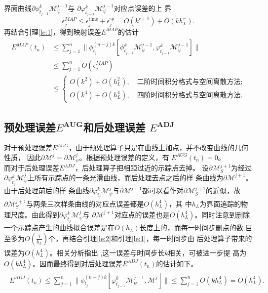 \documentclass[a4paper,twoside]{ctexart}
\begin{document}
界面曲线$\partial\phi_{t_{j-1}}^{k}\mathcal{M}_{\psi}^{j-1}$与
$\partial\varphi_{t_{j-1}}^{k}\mathcal{M}_{\psi}^{j-1}$对应点误差的上
界
\begin{equation}
  \label{eq:errbound}
  \epsilon_j^{MAP} \le \epsilon_j^{\text{time}} +
  \epsilon_j^{\text{sp}} = O(k^{r+1}) + O(kh_L^r).
\end{equation}
再结合引理\ref{le:1}，得到映射误差$E^{MAP}$的估计
\begin{eqnarray}
  \label{eq:calEMAP}
  \begin{aligned}
    E^{MAP}(t_n) &\le \sum_{j=1}^{n}\| \phi_{t_j}^{(n-j)k}[\phi_{t_{j-1}}^{k}\mathcal{M}_{\psi}^{j-1},\varphi_{t_{j-1}}^{k}\mathcal{M}_{\psi}^{j-1}]
    \|\\
    &\le \sum_{j=1}^{n}O(\epsilon_j^{MAP})\\
    &\le \begin{cases}
 O(k^2) + O(h_L^2),\quad \text{二阶时间积分格式与空间离散方法;}\\
 O(k^4) + O(h_L^4),\quad \text{四阶时间积分格式与空间离散方法.}
\end{cases}
  \end{aligned}
\end{eqnarray}
\subsection{预处理误差$E^{\textbf{AUG}}$和后处理误差
  $E^{\textbf{ADJ}}$}
\label{sec:AUGandADJ}
对于预处理误差$E^{AUG}$，由于预处理算子只是在曲线上加点，并不改变曲线的几何性质，
因此$\partial \mathcal{M}^j = \partial \mathcal{M}_{\psi}^j$。根据预处理误差的定义，有
$E^{AUG}(t_n) = 0$。\\
\indent 而对于后处理误差$E^{ADJ}$，后处理算子把相距过近的示踪点去掉。
设$\partial \mathcal{M}_S^{j+1}$为经过$\partial \varphi_{t_j}^k
\mathcal{M}_{\psi}^j$上所有示踪点的一条光滑曲线，而后处理去点之后的样
条曲线为$\partial \mathcal{M}^{j+1}$。由于后处理前后的样
条曲线$\partial \varphi_{t_j}^k
\mathcal{M}_{\psi}^j$与$\partial \mathcal{M}^{j+1}$都可以看作对$\partial \mathcal{M}_S^{j+1} $的近似，故$\partial
\mathcal{M}_S^{j+1} $与两条三次样条曲线的对应点误差都是$O(h_L^4)$，其
中$h_L$为界面追踪的物理尺度。由此得到$\partial \varphi_{t_j}^k
\mathcal{M}_{\psi}^j$与
$\partial \mathcal{M}^{j+1}$对应点的误差也是$O(h_L^4)$。同时注意到删除
一个示踪点产生的曲线拟合误差是在$O(h_L)$长度上的，而每一时间步删点的数
目至多为$O(\frac{1}{h_L})$个，再结合引理\ref{le:2}和引理\ref{le:1}，每一时间步由
后处理算子带来的误差为$O(h_L^4)$。相关分析指出
\textsuperscript{\cite{ref7}},这一误差与时间步长$k$相关，可被进一步提
高为$O(kh_L^4)$。因而最终得到对后处理误差$E^{ADJ}(t_n)$的估计如下。
\begin{eqnarray}
  \label{eq:calEADJ}
  \begin{aligned}
    E^{ADJ}(t_n) \le \sum_{j=1}^{n}\| \phi_{t_j}^{(n-j)k}[\varphi_{t_{j-1}}^{k}\mathcal{M}_{\psi}^{j-1},\mathcal{M}^j]
    \|
    \le \sum_{j=1}^{n}O(kh_L^4)
     = O(h_L^4).
  \end{aligned}
\end{eqnarray}
\end{document}
